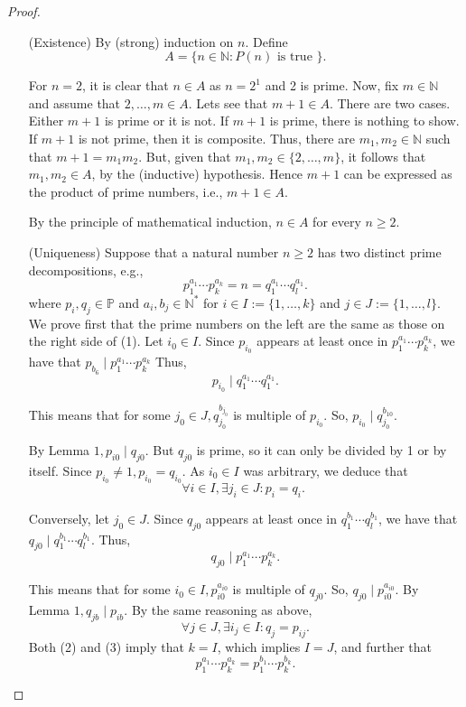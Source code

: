 \documentclass[11pt,a4paper]{article}
\begin{document}
\begin{proof}
\begin{enumerate}[left=2cm]
    \item[(Existence)] By (strong) induction on $n$. Define
\[
A=\{n \in \mathbb{N}: P(n) \text { is true }\} .
\]

For $n=2$, it is clear that $n \in A$ as $n=2^1$ and 2 is prime. Now, fix $m \in \mathbb{N}$ and assume that $2, \ldots, m \in A$. Lets see that $m+1 \in A$. There are two cases. Either $m+1$ is prime or it is not.
If $m+1$ is prime, there is nothing to show.
If $m+1$ is not prime, then it is composite. Thus, there are $m_1, m_2 \in \mathbb{N}$ such that $m+1=m_1 m_2$. But, given that $m_1, m_2 \in\{2, \ldots, m\}$, it follows that $m_1, m_2 \in A$, by the (inductive) hypothesis. Hence $m+1$ can be expressed as the product of prime numbers, i.e., $m+1 \in A$.

By the principle of mathematical induction, $n \in A$ for every $n \geq 2$.

\item[(Uniqueness)] Suppose that a natural number $n \geq 2$ has two distinct prime decompositions, e.g.,
\[
p_1^{a_1} \cdots p_k^{a_k}=n=q_1^{a_1} \cdots q_l^{a_1} .
\]
where $p_i, q_j \in \mathbb{P}$ and $a_i, b_j \in \mathbb{N}^*$ for $i \in I:=\{1, \ldots, k\}$ and $j \in J:=\{1, \ldots, l\}$. We prove first that the prime numbers on the left are the same as those on the right side of (1). Let $i_0 \in I$. Since $p_{i_0}$ appears at least once in $p_1^{a_1} \cdots p_k^{a_k}$, we have that $p_{b_6} \mid p_1^{a_1} \cdots p_k^{a_k}$ Thus,
\[
p_{i_0} \mid q_1^{a_1} \cdots q_1^{a_1} .
\]

This means that for some $j_0 \in J, q_{j_0}^{b_{j_0}}$ is multiple of $p_{i_0}$. So, $p_{i_0} \mid q_{j_0}^{b_{10}}$.

By Lemma $1, p_{i 0} \mid q_{j 0}$. But $q_{j 0}$ is prime, so it can only be divided by 1 or by itself. Since $p_{i_0} \neq 1, p_{i_0}=q_{i_0}$. As $i_0 \in I$ was arbitrary, we deduce that
\[
\forall i \in I, \exists j_i \in J: p_i=q_i \text {. }
\]

Conversely, let $j_0 \in J$. Since $q_{j 0}$ appears at least once in $q_1^{b_1} \cdots q_l^{b_1}$, we have that $q_{j 0} \mid q_1^{b_1} \cdots q_l^{b_1}$. Thus,
\[
q_{j 0} \mid p_1^{a_1} \cdots p_k^{a_k} .
\]

This means that for some $i_0 \in I, p_{i 0}^{a_{i 0}}$ is multiple of $q_{j 0}$. So, $q_{j 0} \mid p_{i 0}^{a_{i 0}}$. By Lemma $1, q_{j b} \mid p_{i b}$. By the same reasoning as above,
\[
\forall j \in J, \exists i_j \in I: q_j=p_{i j} .
\]
Both (2) and (3) imply that $k=I$, which implies $I=J$, and further that
\[
p_1^{a_1} \cdots p_k^{a_k}=p_1^{b_1} \cdots p_k^{b_k} .
\]


\end{enumerate}
\end{proof}
\end{document}
